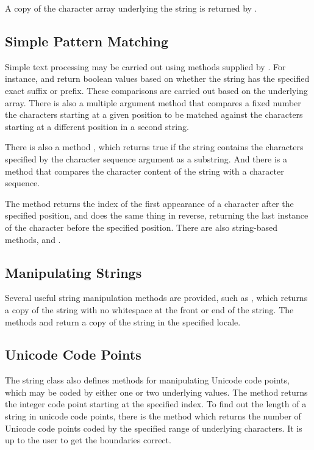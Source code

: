 A copy of the character array underlying the string is returned
by .  

\subsection{Simple Pattern Matching}

Simple text processing may be carried out using methods supplied
by .  For instance,  and
 return boolean values based on whether
the string has the specified exact suffix or prefix.  These
comparisons are carried out based on the underlying 
array.  There is also a multiple argument 
method that compares a fixed number the characters starting at a given
position to be matched against the characters starting at a different
position in a second string.

There is also a method , which returns
true if the string contains the characters specified by the character
sequence argument as a substring.  And there is a method
 that compares the character content
of the string with a character sequence.

The  method returns the index of the first
appearance of a character after the specified position, and
 does the same thing in reverse,
returning the last instance of the character before the specified
position.  There are also string-based methods,  and
.

\subsection{Manipulating Strings}

Several useful string manipulation methods are provided, such as
, which returns a copy of the string with no whitespace
at the front or end of the string.  The methods
 and  return a
copy of the string in the specified locale.

\subsection{Unicode Code Points}

The string class also defines methods for manipulating Unicode
code points, which may be coded by either one or two underlying
 values.  The method  returns
the integer code point starting at the specified index.  To find out
the length of a string in unicode code points, there is the method
 which returns the number of Unicode
code points coded by the specified range of underlying characters.  It
is up to the user to get the boundaries correct.

